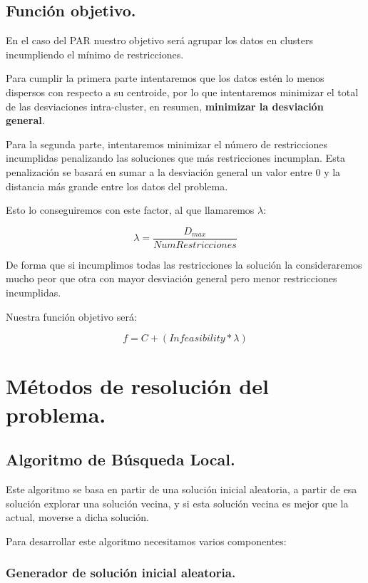\documentclass[12pt, spanish]{article}
\begin{document}
\subsection{Función objetivo.}

En el caso del PAR nuestro objetivo será agrupar los datos en clusters incumpliendo el mínimo de restricciones.

Para cumplir la primera parte intentaremos que los datos estén lo menos dispersos con respecto a su centroide, por lo que intentaremos minimizar el total de las desviaciones intra-cluster, en resumen, \textbf{minimizar la desviación general}. 

Para la segunda parte, intentaremos minimizar el número de restricciones incumplidas penalizando las soluciones que más restricciones incumplan. Esta penalización se basará en sumar a la desviación general un valor entre 0 y la distancia más grande entre los datos del problema.

Esto lo conseguiremos con este factor, al que llamaremos $\lambda$:

$$ \lambda = \frac{D_{max}}{NumRestricciones} $$ 


De forma que si incumplimos todas las restricciones la solución la consideraremos mucho peor que otra con mayor desviación general pero menor restricciones incumplidas.

Nuestra función objetivo será:

$$ f = C + (\textit{Infeasibility} * \lambda) $$ 


\newpage

\section{Métodos de resolución del problema.}

\subsection{Algoritmo de Búsqueda Local.}

Este algoritmo se basa en partir de una solución inicial aleatoria, a partir de esa solución explorar una solución vecina, y si esta solución vecina es mejor que la actual, moverse a dicha solución.

 Para desarrollar este algoritmo necesitamos varios componentes:
 
 \subsubsection{Generador de solución inicial aleatoria.}
 
\end{document}

